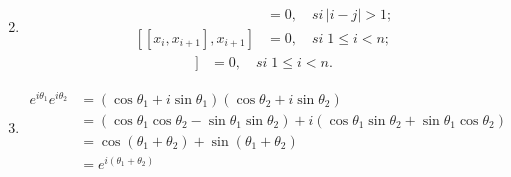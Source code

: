 \documentclass[12pt]{article}
\begin{document}
\begin{enumerate}
\begin{align}
     \end{align}
     \item
        \begin{align*}
         [x_{i},x_{j}]&=0, \quad si \, \left| i-j\right| > 1;\\
         [[x_{i},x_{i+1}],x_{i+1} ]&=0, \quad si \; 1 \leq i < n;
         \end{align*}
         \begin{align}
         [x_{i},[x_{i},x_{i+1}] ]&=0, \quad si \; 1 \leq i < n.
         \end{align}
     \item
     \begin{align*}
         e^{i\theta_{1}} e^{i\theta_{2}} &= (\cos \theta_{1} + i\sin \theta_{1})(\cos \theta_{2} + i\sin \theta_{2})\\
         &=(\cos \theta_{1} \cos \theta_{2} - \sin \theta_{1} \sin \theta_{2})+ i(\cos \theta_{1} \sin \theta_{2} + \sin \theta_{1} \cos \theta_{2})\\
         &=\cos (\theta_{1} + \theta_{2})+ \sin (\theta_{1} + \theta_{2})\\
         &=e^{i(\theta_{1}+\theta_{2})}
     \end{align*}
 \end{enumerate}
\end{document}
